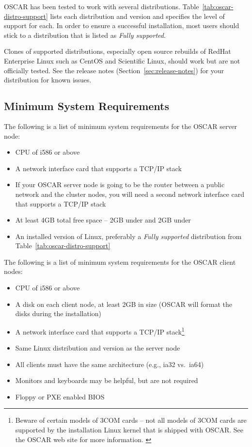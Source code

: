 OSCAR has been tested to work with several distributions.
Table~\ref{tab:oscar-distro-support} lists each distribution and
version and specifies the level of support for each. In order to
ensure a successful installation, most users should stick to a
distribution that is listed as \emph{Fully supported}.



Clones of supported distributions, especially open source rebuilds of
RedHat Enterprise Linux such as CentOS and Scientific Linux, should
work but are not officially tested.  See the release notes 
(Section~\ref{sec:release-notes}) for your distribution for known issues.


\subsection{Minimum System Requirements}
\label{sec:intro-min-sys}


The following is a list of minimum system requirements for the OSCAR
server node:

\begin{itemize}
\item CPU of i586 or above
\item A network interface card that supports a TCP/IP stack
\item If your OSCAR server node is going to be the router between a
  public network and the cluster nodes, you will need a second
  network interface card that supports a TCP/IP stack
\item At least 4GB total free space -- 2GB under \file{/} and 2GB
  under 
\item An installed version of Linux, preferably a {\em Fully
    supported} distribution from Table~\ref{tab:oscar-distro-support}
\end{itemize}

\noindent The following is a list of minimum system requirements for
the OSCAR client nodes:

\begin{itemize}
\item CPU of i586 or above
\item A disk on each client node, at least 2GB in size (OSCAR will
  format the disks during the installation)
\item A network interface card that supports a TCP/IP
  stack\footnote{Beware of certain models of 3COM cards -- not all
    models of 3COM cards are supported by the installation Linux
    kernel that is shipped with OSCAR.  See the OSCAR web site for
    more information. \label{foot:3com-warning}}
\item Same Linux distribution and version as the server node
\item All clients must have the same architecture (e.g., ia32 vs.\
  ia64)
\item Monitors and keyboards may be helpful, but are not required
\item Floppy or PXE enabled BIOS
\end{itemize}


